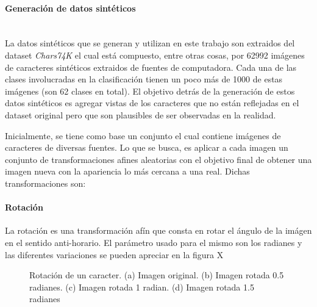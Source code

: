 		\paragraph{Generación de datos sintéticos} ~\\

			La datos sintéticos que se generan y utilizan en este trabajo son extraidos del dataset \textit{Chars74K} el cual está compuesto, entre otras cosas, por 62992 imágenes de caracteres sintéticos extraidos de fuentes de computadora. Cada una de las clases involucradas en la clasificación tienen un poco más de 1000 de estas imágenes (son 62 clases en total). El objetivo detrás de la generación de estos datos sintéticos es agregar vistas de los caracteres que no están reflejadas en el dataset original pero que son plausibles de ser observadas en la realidad.
			
			Inicialmente, se tiene como base un conjunto el cual contiene imágenes de caracteres de diversas fuentes. Lo que se busca, es aplicar a cada imagen un conjunto de transformaciones afines aleatorias con el objetivo final de obtener una imagen nueva con la apariencia  lo más cercana a una real. Dichas transformaciones son:
			
			\paragraph{Rotación}
			
				La rotación es una transformación afín que consta en rotar el ángulo de la imágen en el sentido anti-horario. El parámetro usado para el mismo son los radianes y las diferentes variaciones se pueden apreciar en la figura X
		\begin{figure}[htbp]
			\centering
			\caption[Rotación de un caracter]{Rotación de un caracter. (a) Imagen original. (b) Imagen rotada 0.5 radianes. (c) Imagen rotada 1 radian. (d) Imagen rotada 1.5 radianes}
			\label{fig: Transformacion Afin - Rotacion}
		\end{figure}	
			

